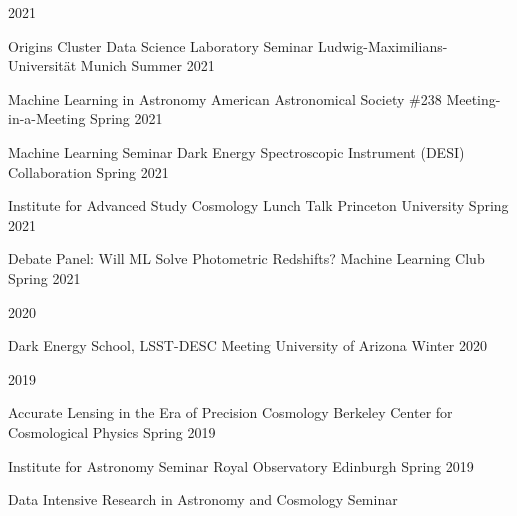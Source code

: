 \documentclass[11pt,letterpaper]{article}
\begin{document}
%
\clearpage

%

%
\clearpage

\nopagebreak\begin{list}{}{\malzlist}
	\item 2021
\nopagebreak\begin{list}{}{\malzlist}
\item \talk{}
	{Origins Cluster Data Science Laboratory Seminar}
	{Ludwig-Maximilians-Universit{\"a}t Munich}%
	{Summer 2021}
\item {}
	{Machine Learning in Astronomy}%
	{American Astronomical Society \#238 Meeting-in-a-Meeting}
	{Spring 2021}
\item \talk{}
	{Machine Learning Seminar}
	{Dark Energy Spectroscopic Instrument (DESI) Collaboration}
	{Spring 2021}
\item \talk{}
	{Institute for Advanced Study Cosmology Lunch Talk}
	{Princeton University}
	{Spring 2021}
\item \talk{}
	{Debate Panel: Will ML Solve Photometric Redshifts?}
	{Machine Learning Club}
	{Spring 2021}
\end{list}
\item 2020
\nopagebreak\begin{list}{}{\malzlist}
\item {}
	{Dark Energy School, LSST-DESC Meeting}
	{University of Arizona}
	{Winter 2020}
\end{list}
\item 2019
\nopagebreak\begin{list}{}{\malzlist}
\item {}
  {Accurate Lensing in the Era of Precision Cosmology}
	{Berkeley Center for Cosmological Physics}
	{Spring 2019}
\item {}
  {Institute for Astronomy Seminar}
	{Royal Observatory Edinburgh}
	{Spring 2019}
\item {}
  {Data Intensive Research in Astronomy and Cosmology Seminar}

\end{list}
\end{list}
\end{document}
